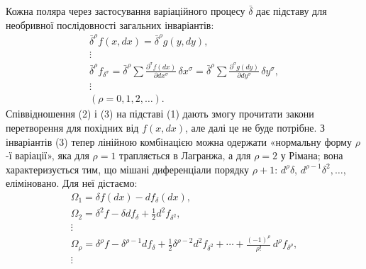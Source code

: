 \documentclass[11pt]{article}
\providecommand{\bdelta}{\bar{\delta}}
\begin{document}
Кожна поляра через застосування варіаційного процесу \(\bdelta\) дає підставу для необривної послідовності загальних інваріантів:
\begin{equation}
\begin{gathered}
\bdelta^\rho f(x,dx)=\bdelta^\rho g(y,dy),\\
\vdots\\
\bdelta^\rho f_{\delta^\sigma}
=\bdelta^\rho\sum\frac{\partial^\sigma f(dx)}{\partial dx^\sigma}\,
\delta x^\sigma
=\bdelta^\rho\sum\frac{\partial^\sigma g(dy)}{\partial dy^\sigma}\,
\delta y^\sigma,\\
\vdots\\[0.2em]
(\rho=0,1,2,\ldots).
\end{gathered}
\tag{3}
\end{equation}
Співвідношення (2) і (3) на підставі (1) дають змогу прочитати закони перетворення для похідних від \(f(x,dx)\), але далі це не буде потрібне. З інваріантів (3) тепер лінійною комбінацією можна одержати «нормальну форму \(\rho\)-ї варіації», яка для \(\rho=1\) трапляється в Лагранжа, а для \(\rho=2\) у Рімана; вона характеризується тим, що мішані диференціали порядку \(\rho+1\): \(d^\rho\delta\), \(d^{\rho-1}\delta^2,\ldots\), еліміновано. Для неї дістаємо:
\begin{equation}
\begin{gathered}
\Omega_1=\delta f(dx)-d f_\delta(dx),\\
\Omega_2=\delta^2 f-\delta d f_\delta+\frac12 d^2 f_{\delta^2},\\
\vdots\\
\Omega_\rho=\delta^\rho f-\delta^{\rho-1}d f_\delta
+\frac12\delta^{\rho-2}d^2 f_{\delta^2}
+\cdots+\frac{(-1)^\rho}{\rho!}\,d^\rho f_{\delta^\rho},\\
\vdots
\end{gathered}
\tag{4}
\end{equation}
\end{document}
